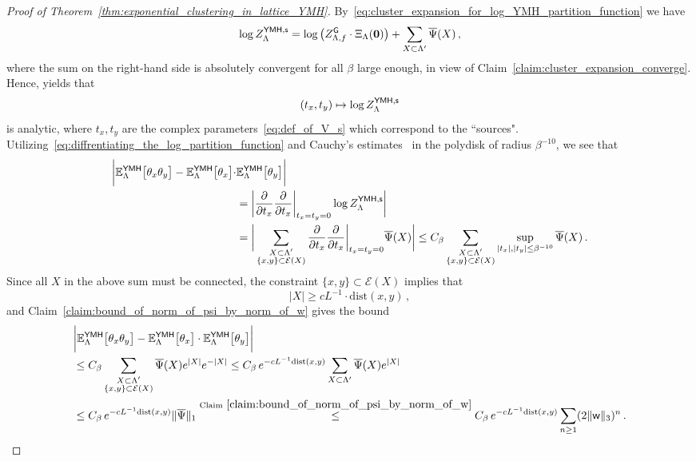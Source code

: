 \documentclass[11pt]{article}
\theoremstyle{definition}
\theoremstyle{remark}
\numberwithin{theorem}{section}
\def\La{{\Lambda}}
\newcommand{\bE}{\mathbb E}
\newcommand{\cE}{\mathcal{E}}
\begin{document}
    \begin{proof}[Proof of Theorem~\ref{thm:exponential_clustering_in_lattice_YMH}]
        By~\eqref{eq:cluster_expansion_for_log_YMH_partition_function} we have 
        \[
         \log Z_{\Lambda}^{{\sf YMH,s}} = \log \big(Z_{\Lambda,f}^{{\sf G}}\cdot \Xi_{\Lambda} (\mathbf{0})\big) + \sum_{X\subset \La^\prime} \overline \Psi(X) \, ,
        \]
        where the sum on the right-hand side is absolutely convergent for all $\beta$ large enough, in view of Claim~\ref{claim:cluster_expansion_converge}. Hence, \cite[Theorem~5.8]{Friedli-Velenik_book} yields that $$(t_x,t_y) \mapsto \log Z_{\Lambda}^{{\sf YMH,s}}$$ is analytic, where $t_x,t_y$ are the complex parameters~\eqref{eq:def_of_V_s} which correspond to the ``sources". Utilizing~\eqref{eq:diffrentiating_the_log_partition_function} and Cauchy's estimates~\cite[Theorem~2.2.7]{Hormander-SeveralComplexVariables} in the polydisk of radius $\beta^{-10}$, we see that
        \begin{align*}
                 \bigg|\bE_{\Lambda}^{\sf YMH}\big[\theta_x \theta_y\big] - \bE_{\Lambda}^{\sf YMH}\big[\theta_x \big]\cdot & \bE_{\Lambda}^{\sf YMH}\big[ \theta_y\big] \bigg| \\ &= \bigg| \frac{\partial}{\partial t_x} \frac{\partial}{\partial t_x} \bigg|_{t_x=t_y=0} \log Z_{\Lambda}^{\sf YMH,s} \bigg| \\ & = \bigg|\sum_{\substack{X\subset \La^\prime \\ \{x,y\} \subset \cE(X) }} \frac{\partial}{\partial t_x} \frac{\partial}{\partial t_x} \bigg|_{t_x=t_y=0} \overline{\Psi} (X) \bigg| \le C_{\beta} \sum_{\substack{X\subset \La^\prime \\ \{x,y\} \subset \cE(X) }} \sup_{|t_x|,|t_y| \le \beta^{-10}}\overline{\Psi} (X) \, .
        \end{align*}
        Since all $X$ in the above sum must be connected, the constraint $\{x,y\} \subset \cE (X)$ implies that $$|X|\ge c L^{-1} \cdot \text{dist}(x,y) \, ,$$  and Claim~\ref{claim:bound_of_norm_of_psi_by_norm_of_w} gives the bound
        \begin{align*}
            &\bigg|\bE_{\Lambda}^{\sf YMH}\big[\theta_x \theta_y\big] - \bE_{\Lambda}^{\sf YMH}\big[\theta_x \big]\cdot \bE_{\Lambda}^{\sf YMH}\big[ \theta_y\big] \bigg| \\
            &\le C_\beta \sum_{\substack{X\subset \La^\prime \\ \{x,y\} \subset \cE(X) }} \overline{\Psi} (X) e^{|X|} e^{-|X|} \le C_\beta \, e^{-cL^{-1}\text{dist}(x,y)} \sum_{X\subset \La^\prime} \overline{\Psi}(X) e^{|X|}  \\ &\le C_\beta \, e^{-cL^{-1}\text{dist}(x,y)} \| \overline \Psi \|_1 \stackrel{\text{Claim}~\ref{claim:bound_of_norm_of_psi_by_norm_of_w}}{\le} C_\beta \,   e^{-cL^{-1}\text{dist}(x,y)} \sum_{n\ge 1} (2 \| {\sf w} \|_3)^n \, . 

\end{align*}
\end{proof}
\end{document}
